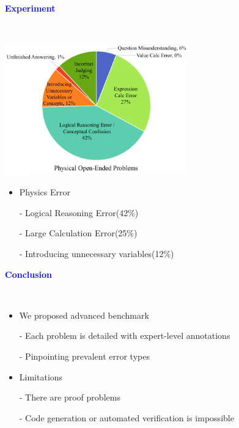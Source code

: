 \documentclass[professionalfont]{beamer}
\begin{document}
\begin{frame}
\begin{center}
    { \textbf{\textcolor{blue}{ {\fontsize{12}{14}\selectfont Experiment} }} }
\end{center}
\\[0.2cm]

\begin{center}
    \includegraphics[width=0.6\textwidth]{figure4-2.png}
\end{center}

{\fontsize{10}{14}\selectfont 
\begin{itemize}
    \item Physics Error

    - Logical Reasoning Error(42\%) 
    
    - Large Calculation Error(25\%)
    
    - Introducing unnecessary variables(12\%)
    
\end{itemize}
}

\end{frame}

\begin{frame}
\begin{center}
    { \textbf{\textcolor{blue}{ {\fontsize{12}{14}\selectfont Conclusion} }} }
\end{center}
\\[0.2cm]

{\fontsize{10}{14}\selectfont 
\begin{itemize}
    \item We proposed advanced benchmark

    - Each problem is detailed with expert-level annotations
    
    - Pinpointing prevalent error types

    \item Limitations

    - There are proof problems

    - Code generation or automated verification is impossible
\end{itemize}
}

\end{frame}
\end{document}
